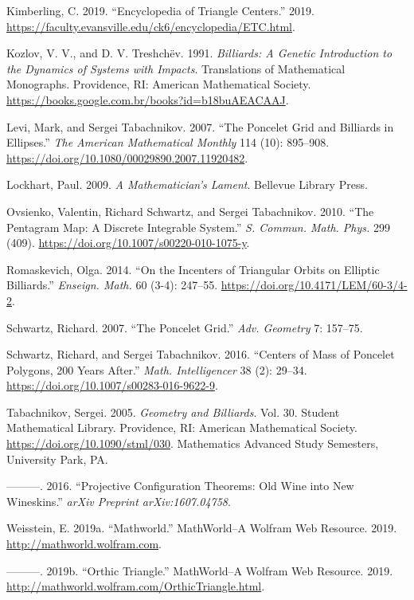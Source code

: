 \documentclass[]{article}
\begin{document}
\leavevmode\hypertarget{ref-etc}{}%
Kimberling, C. 2019. ``Encyclopedia of Triangle Centers.'' 2019. \url{https://faculty.evansville.edu/ck6/encyclopedia/ETC.html}.

\leavevmode\hypertarget{ref-kozlov91}{}%
Kozlov, V. V., and D. V. Treshchëv. 1991. \emph{Billiards: A Genetic Introduction to the Dynamics of Systems with Impacts}. Translations of Mathematical Monographs. Providence, RI: American Mathematical Society. \url{https://books.google.com.br/books?id=b18buAEACAAJ}.

\leavevmode\hypertarget{ref-sergei07_grid}{}%
Levi, Mark, and Sergei Tabachnikov. 2007. ``The Poncelet Grid and Billiards in Ellipses.'' \emph{The American Mathematical Monthly} 114 (10): 895--908. \url{https://doi.org/10.1080/00029890.2007.11920482}.

\leavevmode\hypertarget{ref-lockhart09}{}%
Lockhart, Paul. 2009. \emph{A Mathematician's Lament}. Bellevue Library Press.

\leavevmode\hypertarget{ref-sergei10_pentagram}{}%
Ovsienko, Valentin, Richard Schwartz, and Sergei Tabachnikov. 2010. ``The Pentagram Map: A Discrete Integrable System.'' \emph{S. Commun. Math. Phys.} 299 (409). \url{https://doi.org/10.1007/s00220-010-1075-y}.

\leavevmode\hypertarget{ref-olga14}{}%
Romaskevich, Olga. 2014. ``On the Incenters of Triangular Orbits on Elliptic Billiards.'' \emph{Enseign. Math.} 60 (3-4): 247--55. \url{https://doi.org/10.4171/LEM/60-3/4-2}.

\leavevmode\hypertarget{ref-schwartz07}{}%
Schwartz, Richard. 2007. ``The Poncelet Grid.'' \emph{Adv. Geometry} 7: 157--75.

\leavevmode\hypertarget{ref-sergei2016}{}%
Schwartz, Richard, and Sergei Tabachnikov. 2016. ``Centers of Mass of Poncelet Polygons, 200 Years After.'' \emph{Math. Intelligencer} 38 (2): 29--34. \url{https://doi.org/10.1007/s00283-016-9622-9}.

\leavevmode\hypertarget{ref-sergei91}{}%
Tabachnikov, Sergei. 2005. \emph{Geometry and Billiards}. Vol. 30. Student Mathematical Library. Providence, RI: American Mathematical Society. \url{https://doi.org/10.1090/stml/030}. Mathematics Advanced Study Semesters, University Park, PA.

\leavevmode\hypertarget{ref-sergei2016proj}{}%
---------. 2016. ``Projective Configuration Theorems: Old Wine into New Wineskins.'' \emph{arXiv Preprint arXiv:1607.04758}.

\leavevmode\hypertarget{ref-mw}{}%
Weisstein, E. 2019a. ``Mathworld.'' MathWorld--A Wolfram Web Resource. 2019. \url{http://mathworld.wolfram.com}.

\leavevmode\hypertarget{ref-mw_orthic}{}%
---------. 2019b. ``Orthic Triangle.'' MathWorld--A Wolfram Web Resource. 2019. \url{http://mathworld.wolfram.com/OrthicTriangle.html}.
\end{document}
